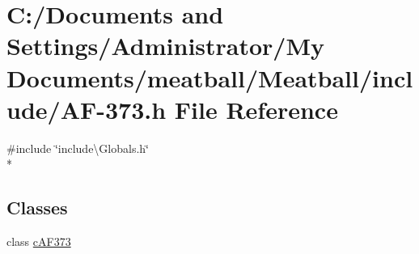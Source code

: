 \hypertarget{_a_f-373_8h}{\section{C\-:/\-Documents and Settings/\-Administrator/\-My Documents/meatball/\-Meatball/include/\-A\-F-\/373.h File Reference}
\label{_a_f-373_8h}
}
{\ttfamily \#include \char`\"{}include\textbackslash{}\-Globals.\-h\char`\"{}}\\*
\subsection*{Classes}
\begin{DoxyCompactItemize}
\item 
class \hyperlink{classc_a_f373}{c\-A\-F373}
\end{DoxyCompactItemize}
